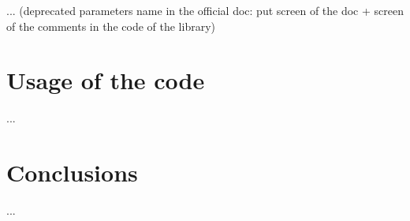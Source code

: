 \documentclass[11pt,a4paper]{article}
\begin{document}
... (deprecated parameters name in the official doc: put screen of the doc +
screen of the comments in the code of the library)
%



\section{Usage of the code}

...




\section{Conclusions}

...
\end{document}
